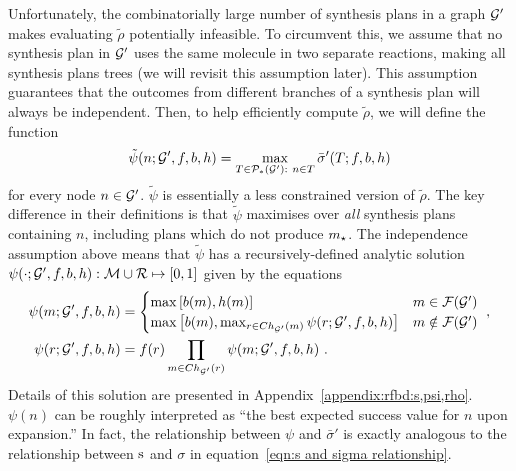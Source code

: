 Unfortunately, the combinatorially large number of synthesis plans
in a graph ${\mathcal{G}}'$ makes evaluating $\tilde\rho$ potentially infeasible.
To circumvent this,
we assume that no synthesis plan in ${\mathcal{G}}'$ uses the same molecule in
two separate reactions, making all synthesis plans trees
(we will revisit this assumption later).
This assumption guarantees that the outcomes from different branches
of a synthesis plan will always be independent.
Then, to help efficiently compute $\tilde\rho$,
we will define the function
\begin{equation}\label{eqn:psi tilde}
    \tilde\psi(n;{\mathcal{G}}',f,b,h)=\max_{T\in\mathcal{P}_*({\mathcal{G}}'):\ n\in T}\bar\sigma'(T;f,b,h)
\end{equation}
for every node $n\in{\mathcal{G}}'$.
$\tilde\psi$ is essentially a less constrained version of $\tilde\rho$.
The key difference in their definitions is that $\tilde\psi$
maximises over \emph{all} synthesis plans containing $n$,
including plans which do not produce $m_\star$.
The independence assumption above
means that 
$\tilde\psi$ has a recursively-defined analytic solution
$\psi(\cdot;{\mathcal{G}}',f,b,h):{\mathcal{M}}\cup{\mathcal{R}}\mapsto[0,1]$
given by the equations
\begin{align}
    \psi(m;{\mathcal{G}}',f,b,h) &= \begin{cases}
    \max\left[b(m), h(m)\right] & m\in\mathcal{F}({\mathcal{G}}') \\
    \max\left[b(m), \max_{r\in Ch_{{\mathcal{G}}'}(m)}\psi(r;{\mathcal{G}}',f,b,h) \right] & m\notin\mathcal{F}({\mathcal{G}}') \\
    \end{cases} \ ,\label{eqn:psi molecule} \\
    \psi(r;{\mathcal{G}}',f,b,h) &= f(r) \prod_{m\in Ch_{{\mathcal{G}}'}(r)} \psi(m;{\mathcal{G}}',f,b,h)\ . \label{eqn:psi reaction}
\end{align}
Details of this solution are presented in Appendix~\ref{appendix:rfbd:s,psi,rho}.
$\psi(n)$ can be roughly interpreted as ``the best expected success value for $n$ upon expansion.''
In fact,
the relationship between $\psi$ and $\bar\sigma'$ is exactly analogous
to the relationship between ${\textnormal{s}}$ and $\sigma$ in equation~\ref{eqn:s and sigma relationship}.

